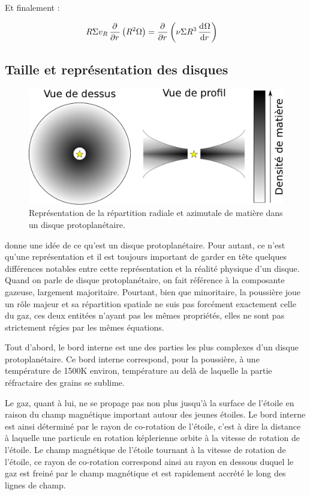 Et finalement :
\begin{important}
\begin{align}
R \Sigma v_R \mathinner{ \dfrac{\partial{^{}}}{\partial{{r}^{}}} }\left(R^2\Omega\right) &= \mathinner{ \dfrac{\partial{^{}}}{\partial{{r}^{}}} }\left(\nu \Sigma R^3 \mathinner{ \dfrac{\operatorname{d \!}{^{}}\Omega}{\operatorname{d \!}{{r}^{}}} }\right)
\end{align}
\end{important}


\subsection{Taille et représentation des disques}%

\begin{figure}[htb]
\centering
\includegraphics[width=0.45\linewidth]{figure/disk_scheme.pdf}
\caption{Représentation de la répartition radiale et azimutale de matière dans un disque protoplanétaire.}\label{fig:disk_scheme}
\end{figure}

 donne une idée de ce qu'est un disque protoplanétaire. Pour autant, ce n'est qu'une représentation et il est toujours important de garder en tête quelques différences notables entre cette représentation et la réalité physique d'un disque. Quand on parle de disque protoplanétaire, on fait référence à la composante gazeuse, largement majoritaire. Pourtant, bien que minoritaire, la poussière joue un rôle majeur et sa répartition spatiale ne suis pas forcément exactement celle du gaz, ces deux entitées n'ayant pas les mêmes propriétés, elles ne sont pas strictement régies par les mêmes équations.

\bigskip

Tout d'abord, le bord interne est une des parties les plus complexes d'un disque protoplanétaire. Ce bord interne correspond, pour la poussière, à une température de 1500K environ, température au delà de laquelle la partie réfractaire des grains se sublime. 

Le gaz, quant à lui, ne se propage pas non plus jusqu'à la surface de l'étoile en raison du champ magnétique important autour des jeunes étoiles. Le bord interne est ainsi déterminé par le rayon de co-rotation de l'étoile, c'est à dire la distance à laquelle une particule en rotation képlerienne orbite à la vitesse de rotation de l'étoile. Le champ magnétique de l'étoile tournant à la vitesse de rotation de l'étoile, ce rayon de co-rotation correspond ainsi au rayon en dessous duquel le gaz est freiné par le champ magnétique et est rapidement accrété le long des lignes de champ. 

